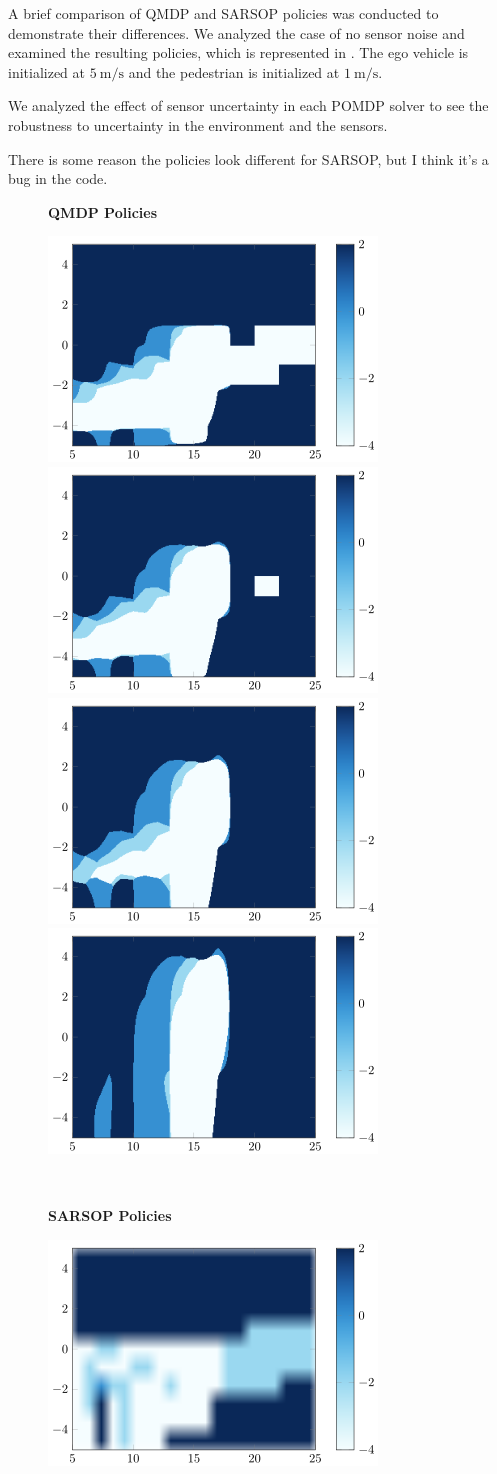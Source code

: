 \documentclass[conference]{IEEEtran}
\begin{document}
A brief comparison of QMDP and SARSOP policies was conducted to demonstrate their differences. We analyzed the case of no sensor noise and examined the resulting policies, which is represented in . The ego vehicle is initialized at $5 ~\si{\meter\per\second}$ and the pedestrian is initialized at $1 ~\si{\meter\per\second}$.

We analyzed the effect of sensor uncertainty in each POMDP solver to see the robustness to uncertainty in the environment and the sensors.

There is some reason the policies look different for SARSOP, but I think it's a bug in the code.

\begin{figure}[htbp]
    \centerline{\textbf{QMDP Policies}}
    \centerline{
        \includegraphics[width=0.25\linewidth]{src/plots/qmdp_0_00001_noise_0_01_no_labels.png}
        \includegraphics[width=0.25\linewidth]{src/plots/qmdp_0_00001_noise_0_5_no_labels.png}
        \includegraphics[width=0.25\linewidth]{src/plots/qmdp_0_00001_noise_1_0_no_labels.png} \includegraphics[width=0.25\linewidth]{src/plots/qmdp_0_00001_noise_2_0_no_labels.png}
    }
    ~ \\
    \centerline{\textbf{SARSOP Policies}}
    \centerline{
        \includegraphics[width=0.25\linewidth]{src/plots/sarsop_0_01_1000_noise_0_01_no_labels.png}
}
\end{figure}
\end{document}
